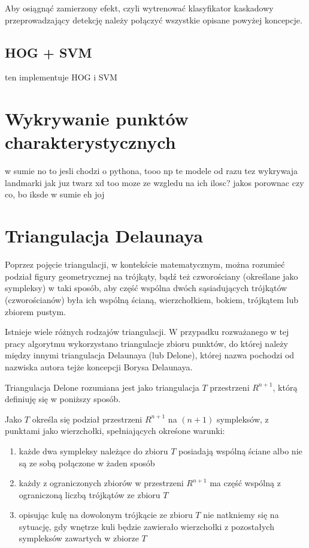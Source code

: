  Aby osiągnąć zamierzony efekt, czyli wytrenować klasyfikator kaskadowy przeprowadzający detekcję należy połączyć wszystkie opisane powyżej koncepcje. 
 
 
 
 
 

 
 
 



 
 

\subsection{HOG + SVM}
ten implementuje HOG i SVM


\section{Wykrywanie punktów charakterystycznych}
w sumie no to jesli chodzi o pythona, tooo np te modele od razu tez wykrywaja landmarki jak juz twarz xd too moze ze wzgledu na ich ilosc? jakos porownac czy co, bo iksde w sumie eh joj

\section{Triangulacja Delaunaya}
Poprzez pojęcie triangulacji, w kontekście matematycznym, można rozumieć podział figury geometrycznej na trójkąty, bądź też czworościany (określane jako sympleksy) w taki sposób, aby część wspólna dwóch sąsiadujących trójkątów (czworościanów) była ich wspólną ścianą, wierzchołkiem, bokiem, trójkątem lub zbiorem pustym. \cite{triangulation}

Istnieje wiele różnych rodzajów triangulacji. W przypadku rozważanego w tej pracy algorytmu wykorzystano triangulacje zbioru punktów, do której należy między innymi triangulacja Delaunaya (lub Delone), której nazwa pochodzi od nazwiska autora tejże koncepcji Borysa Delaunaya. 

Triangulacja Delone \cite{tDelone} rozumiana jest jako triangulacja $T$ przestrzeni $R^{n+1}$, którą definiuję się w poniższy sposób.

Jako $T$ określa się podział przestrzeni $R^{n+1}$ na $(n+1)$ sympleksów, z punktami jako wierzchołki, spełniających okreśone warunki:

\begin{enumerate}
    \item każde dwa sympleksy należące do zbioru $T$ posiadają wspólną ściane albo nie są ze sobą połączone w żaden sposób
    \item każdy z ograniczonych zbiorów w przestrzeni $R^{n+1}$ ma część wspólną z ograniczoną liczbą trójkątów ze zbioru $T$
    \item opisując kulę na dowolonym trójkącie ze zbioru $T$ nie natkniemy się na sytuację, gdy wnętrze kuli będzie zawierało wierzchołki z pozostałych sympleksów zawartych w zbiorze $T$
\end{enumerate}

